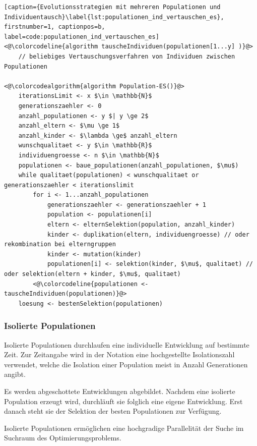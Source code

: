 \begin{lstlisting}[caption={Evolutionsstrategien mit mehreren Populationen und Individuentausch}\label{lst:populationen_ind_vertauschen_es}, firstnumber=1, captionpos=b, label=code:populationen_ind_vertauschen_es]
<@\colorcodeline{algorithm tauscheIndividuen(populationen[1...y] )}@>
	// beliebiges Vertauschungsverfahren von Individuen zwischen Populationen

<@\colorcodealgorithm{algorithm Population-ES()}@>
	iterationsLimit <- x $\in \mathbb{N}$
	generationszaehler <- 0
	anzahl_populationen <- y $| y \ge 2$
	anzahl_eltern <- $\mu \ge 1$
	anzahl_kinder <- $\lambda \ge$ anzahl_eltern
	wunschqualitaet <- y $\in \mathbb{R}$
	individuengroesse <- n $\in \mathbb{N}$
	populationen <- baue_populationen(anzahl_populationen, $\mu$)
	while qualitaet(populationen) < wunschqualitaet or generationszaehler < iterationslimit
		for i <- 1...anzahl_populationen
			generationszaehler <- generationszaehler + 1
			population <- populationen[i]
			eltern <- elternSelektion(population, anzahl_kinder)
			kinder <- duplikation(eltern, individuengroesse) // oder rekombination bei elterngruppen
			kinder <- mutation(kinder)
			populationen[i] <- selektion(kinder, $\mu$, qualitaet) // oder selektion(eltern + kinder, $\mu$, qualitaet)
		<@\colorcodeline{populationen <- tauscheIndividuen(populationen)}@>
	loesung <- bestenSelektion(populationen)
\end{lstlisting}

\subsubsection{Isolierte Populationen}

Isolierte Populationen durchlaufen eine individuelle Entwicklung auf bestimmte Zeit.
Zur Zeitangabe wird in der Notation eine hochgestellte Isolationszahl verwendet, welche die Isolation einer Population meist in Anzahl Generationen angibt.

Es werden abgeschottete Entwicklungen abgebildet.
Nachdem eine isolierte Population erzeugt wird, durchläuft sie folglich eine eigene Entwicklung.
Erst danach steht sie der Selektion der besten Populationen zur Verfügung.

Isolierte Populationen ermöglichen eine hochgradige Parallelität der Suche im Suchraum des Optimierungsproblems.

